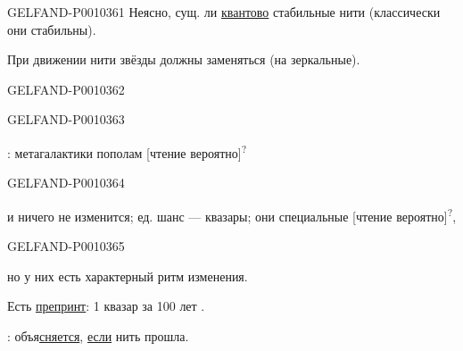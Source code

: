 \begin{GelfandAdjacentEvidence}{GELFAND-P001036}{1}
Неясно, сущ. ли \underline{квантово} стабильные нити (классически они стабильны).

При движении нити звёзды должны заменяться (на зеркальные).
\end{GelfandAdjacentEvidence}
\begin{GelfandAdjacentEvidence}{GELFAND-P001036}{2}

\end{GelfandAdjacentEvidence}
\begin{GelfandAdjacentEvidence}{GELFAND-P001036}{3}


: метагалактики пополам [чтение вероятно]\textsuperscript{?}
\end{GelfandAdjacentEvidence}
\begin{GelfandAdjacentEvidence}{GELFAND-P001036}{4}

и ничего не изменится;
ед. шанс --- квазары; они
специальные [чтение вероятно]\textsuperscript{?},
\end{GelfandAdjacentEvidence}
\begin{GelfandAdjacentEvidence}{GELFAND-P001036}{5}

но у них есть характерный ритм изменения.

Есть \underline{препринт}: 1 квазар за 100 лет
.
\end{GelfandAdjacentEvidence}


: объя\underline{сняется}, \underline{если} нить прошла.


